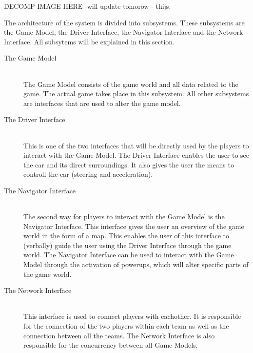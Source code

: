 
DECOMP IMAGE HERE -will update tomorow - thijs.


The architecture of the system is divided into subsystems. These subsystems are the Game Model, the Driver Interface, the Navigator Interface and the Network Interface. All subsytems will be explained in this section.

\begin{description}
	
\item[The Game Model] \hfill \\
The Game Model consists of the game world and all data related to the game. The actual game takes place in this subsystem. All other subsystems are interfaces that are used to alter the game model.

\item[The Driver Interface]  \hfill \\
This is one of the two interfaces that will be directly used by the players to interact with the Game Model. The Driver Interface enables the user to see the car and its direct surroundings. It also gives the user the means to controll the car (steering and acceleration). 

\item[The Navigator Interface]  \hfill \\
The second way for players to interact with the Game Model is the Navigator Interface. This interface gives the user an overview of the game world in the form of a map. This enables the user of this interface to (verbally) guide the user using the Driver Interface through the game world. The Navigator Interface can be used to interact with the Game Model through the activation of powerups, which will alter specific parts of the game world.

\item[The Network Interface]  \hfill \\
This interface is used to connect players with eachother. It is responsible for the connection of the two players within each team as well as the connection between all the teams. The Network Interface is also responsible for the concurrency between all Game Models.

\end{description}
